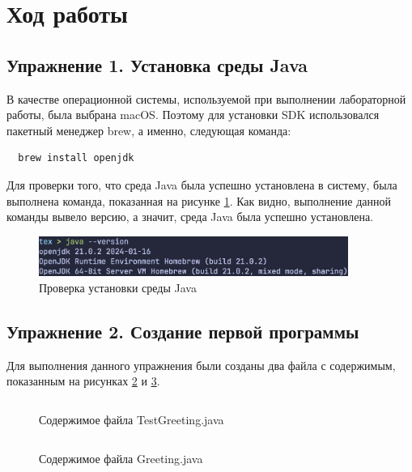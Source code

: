 \documentclass[a4paper, 14pt]{extarticle}
\begin{document}
\section*{Ход работы}

\subsection*{Упражнение 1. Установка среды Java}

В качестве операционной системы, используемой при выполнении лабораторной
работы, была выбрана macOS. Поэтому для установки SDK использовался пакетный
менеджер brew, а именно, следующая команда:
\begin{verbatim}
  brew install openjdk
\end{verbatim}

Для проверки того, что среда Java была успешно установлена в систему, была
выполнена команда, показанная на рисунке \ref{fig:task-1-1}. Как видно,
выполнение данной команды вывело версию, а значит, среда Java была успешно
установлена.

\begin{figure}[H]
  \centering
  \includegraphics[width=0.9\textwidth]{images/task-1/1.png}
  \caption{Проверка установки среды Java}
  \label{fig:task-1-1}
\end{figure}

\subsection*{Упражнение 2. Создание первой программы}

Для выполнения данного упражнения были созданы два файла с содержимым,
показанным на рисунках \ref{fig:task-2-1} и \ref{fig:task-2-2}.

\begin{figure}[H]
  \inputminted{java}{../code/task-2/TestGreeting.java}
  \caption{Содержимое файла TestGreeting.java}
  \label{fig:task-2-1}
\end{figure}

\begin{figure}[H]
  \inputminted{java}{../code/task-2/Greeting.java}
  \caption{Содержимое файла Greeting.java}
  \label{fig:task-2-2}
\end{figure}
\end{document}
